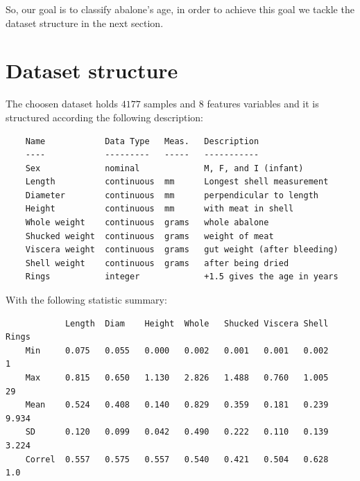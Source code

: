 \documentclass[10pt,a4paper]{article}
\begin{document}
    So, our goal is to classify abalone's age, in order to achieve this goal
    we tackle the dataset structure in the next section.

    \section{Dataset structure}

    The choosen dataset holds $4177$ samples and $8$ features variables and it 
    is structured according the following description:

    \begin{verbatim}
    Name            Data Type   Meas.   Description
    ----            ---------   -----   -----------
    Sex             nominal             M, F, and I (infant)
    Length          continuous  mm      Longest shell measurement
    Diameter        continuous  mm      perpendicular to length
    Height          continuous  mm      with meat in shell
    Whole weight    continuous  grams   whole abalone
    Shucked weight  continuous  grams   weight of meat
    Viscera weight  continuous  grams   gut weight (after bleeding)
    Shell weight    continuous  grams   after being dried
    Rings           integer             +1.5 gives the age in years
    \end{verbatim}

    With the following statistic summary:

    \begin{verbatim}
            Length  Diam    Height  Whole   Shucked Viscera Shell   Rings
    Min     0.075   0.055   0.000   0.002   0.001   0.001   0.002       1
    Max     0.815   0.650   1.130   2.826   1.488   0.760   1.005      29
    Mean    0.524   0.408   0.140   0.829   0.359   0.181   0.239   9.934
    SD      0.120   0.099   0.042   0.490   0.222   0.110   0.139   3.224
    Correl  0.557   0.575   0.557   0.540   0.421   0.504   0.628     1.0
    \end{verbatim}
\end{document}
